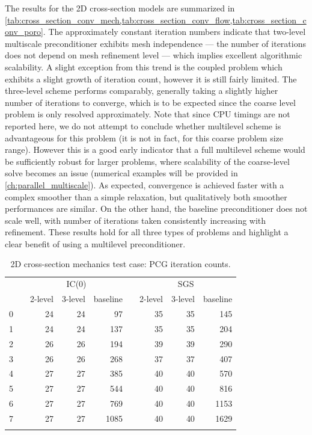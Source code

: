 The results for the 2D cross-section models are summarized in \cref{tab:cross_section_conv_mech,tab:cross_section_conv_flow,tab:cross_section_conv_poro}.   The approximately constant iteration numbers indicate that two-level multiscale preconditioner exhibits mesh independence --- the number of iterations does not depend on mesh refinement level --- which implies excellent algorithmic scalability.   A slight exception from this trend is the coupled problem which exhibits a slight growth of iteration count, however it is still fairly limited.   The three-level scheme performs comparably, generally taking a slightly higher number of iterations to converge, which is to be expected since the coarse level problem is only resolved approximately.   Note that since CPU timings are not reported here, we do not attempt to conclude whether multilevel scheme is advantageous for this problem (it is not in fact, for this coarse problem size range).    However this is a good early indicator that a full multilevel scheme would be sufficiently robust for larger problems, where scalability of the coarse-level solve becomes an issue (numerical examples will be provided in \cref{ch:parallel_multiscale}).   As expected, convergence is achieved faster with a complex smoother than a simple relaxation, but qualitatively both smoother performances are similar.   On the other hand, the baseline preconditioner does not scale well, with number of iterations taken consistently increasing with refinement.   These results hold for all three types of problems and highlight a clear benefit of using a multilevel preconditioner.

\begin{table}
    \centering
    \caption{2D cross-section mechanics test case: PCG iteration counts.}
    \label{tab:cross_section_conv_mech}
    \begin{tabular}{rrrrrrrrr}
        \hline\noalign{\smallskip}
        \multirow{2}{*}{$\ell$} & & \multicolumn{3}{c}{IC(0)} & & \multicolumn{3}{c}{SGS} \\
        \noalign{\smallskip}\cline{3-5} \cline{7-9}\noalign{\smallskip}
        & & 2-level & 3-level & baseline & & 2-level & 3-level & baseline \\
        \hline\noalign{\smallskip}
        0 & & 24 & 24 &   97 & & 35 & 35 &  145 \\
        1 & & 24 & 24 &  137 & & 35 & 35 &  204 \\
        2 & & 26 & 26 &  194 & & 39 & 39 &  290 \\
        3 & & 26 & 26 &  268 & & 37 & 37 &  407 \\
        4 & & 27 & 27 &  385 & & 40 & 40 &  570 \\
        5 & & 27 & 27 &  544 & & 40 & 40 &  816 \\
        6 & & 27 & 27 &  769 & & 40 & 40 & 1153 \\
        7 & & 27 & 27 & 1085 & & 40 & 40 & 1629 \\
        \hline\noalign{\smallskip}
    \end{tabular}
\end{table}

